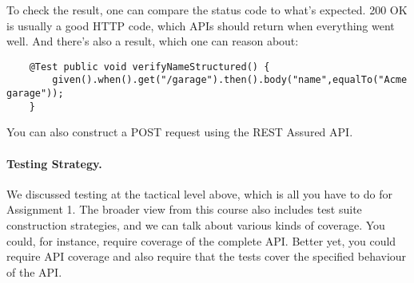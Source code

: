 \documentclass[11pt]{article}
\begin{document}
To check the result, one can compare the status code to what's expected. 200 OK is usually a good HTTP code,
which APIs should return when everything went well. And there's also a result, which one can reason about:
{\small
\begin{lstlisting}
    @Test public void verifyNameStructured() {
        given().when().get("/garage").then().body("name",equalTo("Acme garage"));
    }
\end{lstlisting}
}

You can also construct a POST request using the REST Assured API.

\paragraph{Testing Strategy.} We discussed testing at the tactical level above, which is all you have to do for
Assignment 1. The broader view from this course also includes test suite construction strategies, and
we can talk about various kinds of coverage. You could, for instance, require coverage of the complete API.
Better yet, you could require API coverage and also require that the tests cover the specified behaviour of the API.
\end{document}
